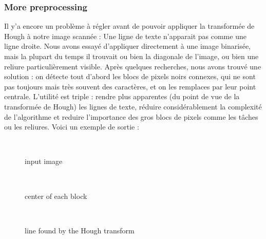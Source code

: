 \subsubsection{More preprocessing}

Il y'a encore un problème à régler avant de pouvoir appliquer la transformée de Hough à notre image scannée : Une ligne de texte n'apparait pas comme une ligne droite. Nous avons essayé d'appliquer directement à une image binarisée, mais la plupart du temps il trouvait ou bien la diagonale de l'image, ou bien une reliure particulièrement visible. Après quelques recherches, nous avons trouvé une solution : on détecte tout d'abord les blocs de pixels noirs connexes, qui ne sont pas toujours mais très souvent des caractères, et on les remplaces par leur point centrale. L'utilité est triple : rendre plus apparentes (du point de vue de la transformée de Hough) les lignes de texte, réduire considérablement la complexité de l'algorithme et reduire l'importance des gros blocs de pixels comme les tâches ou les reliures. Voici un exemple de sortie :

\begin{figure}[h!]\
    \centering
    \caption{input image}
\end{figure}
\begin{figure}[h!]\
    \centering
    \caption{center of each block}
\end{figure}
\begin{figure}[h!]\
    \centering
    \caption{line found by the Hough transform}
\end{figure}
